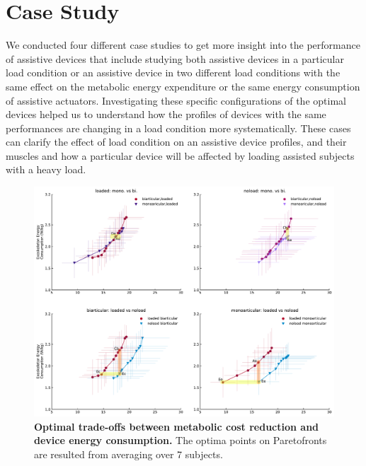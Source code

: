 \documentclass[10pt,letterpaper]{article}
\begin{document}
	\vspace*{0.2in}

		{\Large\textbf{} %
		}

\section*{Case Study}
We conducted four different case studies to get more insight into the performance of assistive devices that include studying both assistive devices in a particular load condition or an assistive device in two different load conditions with the same effect on the metabolic energy expenditure or the same energy consumption of assistive actuators. Investigating these specific configurations of the optimal devices helped us to understand how the profiles of devices with the same performances are changing in a load condition more systematically. These cases can clarify the effect of load condition on an assistive device profiles, and their muscles and how a particular device will be affected by loading assisted subjects with a heavy load.
\begin{figure}[!ht]   
	\centering
	\includegraphics[width=\linewidth]{Case_Studies/PaperFigure_Selected_Configurations.pdf}
	\vspace{1mm}
	\caption{{\small\textbf{Optimal trade-offs between metabolic cost reduction and device energy consumption.} The optima points on Paretofronts are resulted from averaging over 7 subjects.}}
	\label{Fig_Selected_OptimalDevices_On_Pareto}
\end{figure}
\end{document}
